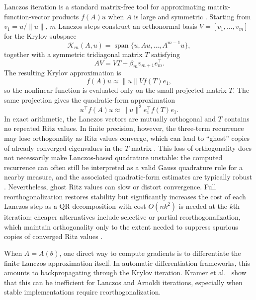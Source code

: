 \documentclass{article}
\begin{document}
Lanczos iteration is a standard matrix-free tool for approximating
matrix-function-vector products \(f(A)u\) when \(A\) is large and symmetric
\citep{golub2013matrix,higham2008functions}. Starting from \(v_1=u/\|u\|\),
\(m\) Lanczos steps construct an orthonormal basis \(V=[v_1,\ldots,v_m]\) for
the Krylov subspace
\[
    \mathcal{K}_m(A,u)=\operatorname{span}\{u,Au,\ldots,A^{m-1}u\},
\]
together with a symmetric tridiagonal matrix \(T\) satisfying
\begin{equation}
    A V = V T + \beta_m v_{m+1} e_m^\top .
    \label{eq:bg_lanczos_relation}
\end{equation}
The resulting Krylov approximation is
\begin{equation}
    f(A)u
    \approx
    \|u\| V f(T)e_1 ,
    \label{eq:bg_lanczos_mvf}
\end{equation}
so the nonlinear function is evaluated only on the small projected matrix \(T\). The
same projection gives the quadratic-form approximation
\begin{equation}
    u^\top f(A)u
    \approx
    \|u\|^2 e_1^\top f(T)e_1 .
    \label{eq:bg_lanczos_quadratic}
\end{equation}
In exact arithmetic, the Lanczos vectors are mutually orthogonal and \(T\)
contains no repeated Ritz values. In finite precision, however, the three-term
recurrence may lose orthogonality as Ritz values converge, which can lead to
``ghost'' copies of already converged eigenvalues in the $T$ matrix
\citep{paige1971computation,paige1972computational,paige1976error,parlett1998symmetric}.
This loss of orthogonality does not necessarily make Lanczos-based quadrature
unstable: the computed recurrence can often still be interpreted as a valid
Gauss quadrature rule for a nearby measure, and the associated quadratic-form
estimates are typically robust \citep{golub2009matrices,meurant2006lanczos}.
Nevertheless, ghost Ritz values can slow or distort convergence. Full
reorthogonalization restores stability but significantly increases the cost of each Lanczos
step as a QR decomposition with cost $O(nk^2)$ is needed at the $k$th iteration; cheaper alternatives include selective or partial reorthogonalization,
which maintain orthogonality only to the extent needed to suppress spurious
copies of converged Ritz values \citep{parlett1979lanczos,simons1984analysis}.

When \(A=A(\theta)\), one direct way to compute gradients is to differentiate the
finite Lanczos approximation itself. In automatic differentiation frameworks, this
amounts to backpropagating through the Krylov iteration. Kramer et
al.~\citep{kramer2024gradients} show that this can be inefficient for Lanczos and
Arnoldi iterations, especially when stable implementations require reorthogonalization.
\end{document}
